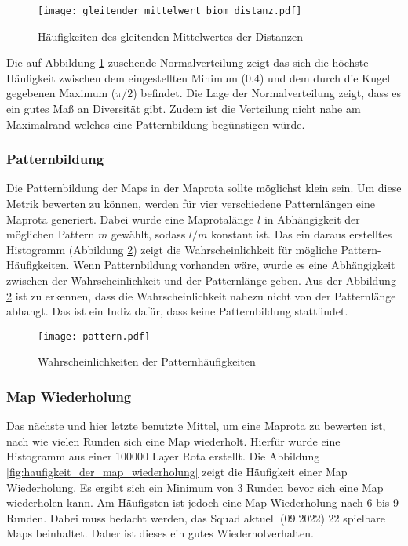             \begin{figure}[htbp]
                \centering
                \texttt{[image: gleitender\_mittelwert\_biom\_distanz.pdf]}
                \caption{Häufigkeiten des gleitenden Mittelwertes der Distanzen}
                \label{fig:haufigkeit_gleitender_mittelwert}
            \end{figure}
            
            Die auf Abbildung \ref{fig:haufigkeit_gleitender_mittelwert} zusehende Normalverteilung zeigt das sich die höchste 
            Häufigkeit zwischen dem eingestellten Minimum (0.4) und dem durch die Kugel gegebenen Maximum ($\pi/2$) befindet.
            Die Lage der Normalverteilung zeigt, dass es ein gutes Maß an Diversität gibt. Zudem ist die
            Verteilung nicht nahe am Maximalrand welches eine Patternbildung begünstigen würde.


        \subsubsection{Patternbildung}
            Die Patternbildung der Maps in der Maprota sollte möglichst klein sein. Um diese Metrik bewerten zu können,
            werden für vier verschiedene Patternlängen eine Maprota generiert. Dabei wurde eine Maprotalänge $l$ in Abhängigkeit
            der möglichen Pattern $m$ gewählt, sodass $l/m$ konstant ist. Das ein daraus erstelltes Histogramm (Abbildung \ref{fig:pattern}) 
            zeigt die Wahrscheinlichkeit für mögliche Pattern-Häufigkeiten. Wenn Patternbildung vorhanden wäre, wurde es eine Abhängigkeit zwischen 
            der Wahrscheinlichkeit und der Patternlänge geben.
            Aus der Abbildung \ref{fig:pattern} ist zu erkennen, dass die Wahrscheinlichkeit nahezu nicht von der Patternlänge abhangt. Das ist ein Indiz dafür,
            dass keine Patternbildung stattfindet.
            \begin{figure}[htbp]
                \centering
                \texttt{[image: pattern.pdf]}
                \caption{Wahrscheinlichkeiten der Patternhäufigkeiten}
                \label{fig:pattern}
            \end{figure}

        \subsubsection{Map Wiederholung}
            Das nächste und hier letzte benutzte Mittel, um eine Maprota zu bewerten ist, nach wie vielen Runden sich eine Map
            wiederholt. Hierfür wurde eine Histogramm aus einer 100000 Layer Rota erstellt.
            Die Abbildung \ref{fig:haufigkeit_der_map_wiederholung} zeigt die Häufigkeit einer Map Wiederholung. Es ergibt sich ein
            Minimum von 3 Runden bevor sich eine Map wiederholen kann. Am Häufigsten ist jedoch eine Map Wiederholung nach 6 bis 9 Runden.
            Dabei muss bedacht werden, das Squad aktuell (09.2022) 22 spielbare Maps beinhaltet. Daher ist dieses ein gutes Wiederholverhalten.

